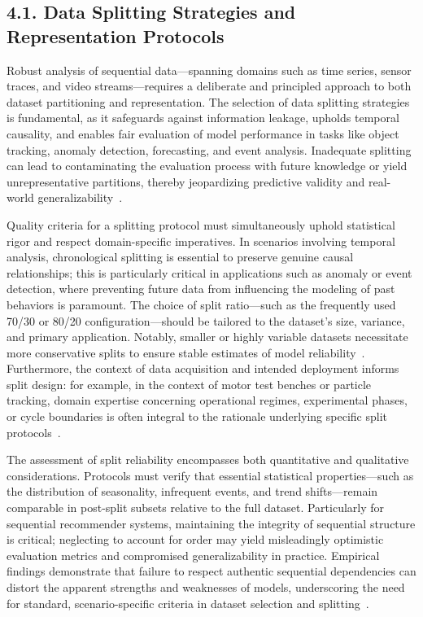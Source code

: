 \documentclass[11pt]{article}
\begin{document}
\subsection{4.1. Data Splitting Strategies and Representation Protocols}

Robust analysis of sequential data—spanning domains such as time series, sensor traces, and video streams—requires a deliberate and principled approach to both dataset partitioning and representation. The selection of data splitting strategies is fundamental, as it safeguards against information leakage, upholds temporal causality, and enables fair evaluation of model performance in tasks like object tracking, anomaly detection, forecasting, and event analysis. Inadequate splitting can lead to contaminating the evaluation process with future knowledge or yield unrepresentative partitions, thereby jeopardizing predictive validity and real-world generalizability~\cite{ref87}.

Quality criteria for a splitting protocol must simultaneously uphold statistical rigor and respect domain-specific imperatives. In scenarios involving temporal analysis, chronological splitting is essential to preserve genuine causal relationships; this is particularly critical in applications such as anomaly or event detection, where preventing future data from influencing the modeling of past behaviors is paramount. The choice of split ratio—such as the frequently used 70/30 or 80/20 configuration—should be tailored to the dataset's size, variance, and primary application. Notably, smaller or highly variable datasets necessitate more conservative splits to ensure stable estimates of model reliability~\cite{ref87}. Furthermore, the context of data acquisition and intended deployment informs split design: for example, in the context of motor test benches or particle tracking, domain expertise concerning operational regimes, experimental phases, or cycle boundaries is often integral to the rationale underlying specific split protocols~\cite{ref87}.

The assessment of split reliability encompasses both quantitative and qualitative considerations. Protocols must verify that essential statistical properties—such as the distribution of seasonality, infrequent events, and trend shifts—remain comparable in post-split subsets relative to the full dataset. Particularly for sequential recommender systems, maintaining the integrity of sequential structure is critical; neglecting to account for order may yield misleadingly optimistic evaluation metrics and compromised generalizability in practice. Empirical findings demonstrate that failure to respect authentic sequential dependencies can distort the apparent strengths and weaknesses of models, underscoring the need for standard, scenario-specific criteria in dataset selection and splitting~\cite{ref87}.
\end{document}
